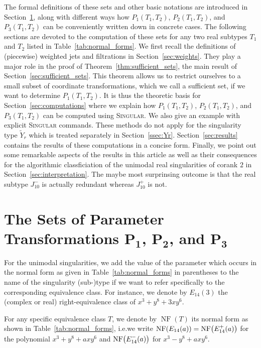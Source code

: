 \documentclass[noend]{amsproc}
\theoremstyle{definition}
\let\originalleft\left
\let\originalright\right
\renewcommand{\left}{\mathopen{}\mathclose\bgroup\originalleft}
\renewcommand{\right}{\aftergroup\egroup\originalright}
\newcommand{\Singular}{\textsc{Singular}}
\newcommand{\tY}{\widetilde{Y}}
\DeclareMathOperator{\NF}{NF}
\begin{document}
The formal definitions of these sets and other basic notations are introduced
in Section~\ref{sec:Psets}, along with different ways how $P_1(T_1, T_2)$,
$P_2(T_1, T_2)$, and $P_3(T_1, T_2)$ can be conveniently written down in
concrete cases. The following sections are devoted to the computation of these
sets for any two real subtypes $T_1$ and $T_2$ listed in
Table~\ref{tab:normal_forms}. We first recall the definitions of (piecewise)
weighted jets and filtrations in Section~\ref{sec:weights}. They play a major
role in the proof of Theorem~\ref{thm:sufficient_sets}, the main result of
Section~\ref{sec:sufficient_sets}. This theorem allows us to restrict ourselves
to a small subset of coordinate transformations, which we call a sufficient
set, if we want to determine $P_1(T_1, T_2)$. It is thus the theoretic basis
for Section~\ref{sec:computations} where we explain how $P_1(T_1, T_2)$,
$P_2(T_1, T_2)$, and $P_3(T_1, T_2)$ can be computed using \Singular{}. We also
give an example with explicit \Singular{} commands. These methods do not apply
for the singularity type $\tY_r$ which is treated separately in
Section~\ref{ssec:Yr}. Section~\ref{sec:results} contains the results of these
computations in a concise form. Finally, we point out some remarkable aspects
of the results in this article as well as their consequences for the
algorithmic classficiation of the unimodal real singularities of corank $2$ in
Section~\ref{sec:interpretation}. The maybe most surprinsing outcome is that
the real subtype $J_{10}^-$ is actually redundant whereas $J_{10}^+$ is not.


\section{The Sets of Parameter Transformations
$\boldsymbol{P_1}$, $\boldsymbol{P_2}$, and $\boldsymbol{P_3}$}%
\label{sec:Psets}

For the unimodal singularities, we add the value of the parameter which occurs
in the normal form as given in Table~\ref{tab:normal_forms} in parentheses to
the name of the singularity (sub-)type if we want to refer specifically to the
corresponding equivalence class. For instance, we denote by $E_{14}(3)$ the
(complex or real) right-equivalence class of $x^3+y^8+3xy^6$.

For any specific equivalence class $T$, we denote by $\NF(T)$ its normal form
as shown in Table~\ref{tab:normal_forms}, i.e.\@ we write
$\NF\left(E_{14}(a)\right) = \NF\left(E_{14}^+(a)\right)$ for the polynomial
$x^3+y^8+axy^6$ and $\NF\left(E_{14}^-(a)\right)$ for $x^3-y^8+axy^6$.
\end{document}
